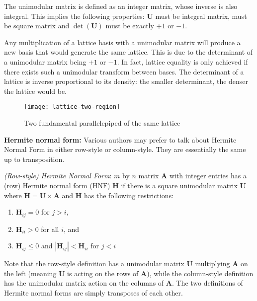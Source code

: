 \begin{definition}
\normalfont
The unimodular matrix is defined as an integer matrix, whose inverse is also integral. This implies the following properties: $\textbf{U}$ must be integral matrix, must be square matrix and $\det(\textbf{U})$ must be exactly $+1$ or $-1$.
\end{definition}

Any multiplication of a lattice basis with a unimodular matrix will produce a new basis that would generate the same lattice. This is due to the determinant of a unimodular matrix being $+1$ or $-1$. In fact, lattice equality is only achieved if there exists such a unimodular transform between bases. The determinant of a lattice is inverse proportional to its density: the smaller determinant, the denser the lattice would be.



\begin{figure}[H]
\texttt{[image: lattice-two-region]}
\centering
\caption{Two fundamental parallelepiped of the same lattice}
\end{figure}


\textbf{Hermite normal form: }
Various authors may prefer to talk about Hermite Normal Form in either row-style or column-style. They are essentially the same up to transposition.

\textit{(Row-style) Hermite Normal Form}: $m$ by $n$ matrix $\textbf{A}$ with integer entries has a (row) Hermite normal form ($\mathrm{HNF}$) $\textbf{H}$ if there is a square unimodular matrix $\textbf{U}$ where $\textbf{H}=\textbf{U} \times \textbf{A}$ and $\textbf{H}$ has the following restrictions:


\begin{enumerate}
    \item $\textbf{H}_{ij}=0$ for $j>i$,
    \item $\textbf{H}_{ii}>0$ for all $i$, and
    \item $\textbf{H}_{ij} \le 0$ and $|\textbf{H}_{ij}|<\textbf{H}_{ii}$ for $j<i$
\end{enumerate}




Note that the row-style definition has a unimodular matrix $\textbf{U}$ multiplying $\textbf{A}$ on the left (meaning $\textbf{U}$ is acting on the rows of $\textbf{A}$), while the column-style definition has the unimodular matrix action on the columns of $\textbf{A}$. The two definitions of Hermite normal forms are simply transposes of each other.

